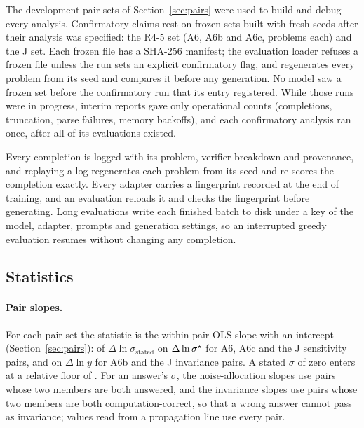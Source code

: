 The development pair sets of Section~\ref{sec:pairs} were used to build and debug every analysis.
Confirmatory claims rest on frozen sets built with fresh seeds after their analysis was specified: the R4-5 set
(A6, A6b and A6c,  problems each) and the J set.
Each frozen file has a SHA-256 manifest; the evaluation loader refuses a frozen file unless the run sets an explicit
confirmatory flag, and regenerates every problem from its seed and compares it before any generation.
No model saw a frozen set before the confirmatory run that its entry registered.
While those runs were in progress, interim reports gave only operational counts (completions, truncation, parse
failures, memory backoffs), and each confirmatory analysis ran once, after all of its evaluations existed.

Every completion is logged with its problem, verifier breakdown and provenance, and replaying a log regenerates each
problem from its seed and re-scores the completion exactly.
Every adapter carries a fingerprint recorded at the end of training, and an evaluation reloads it and checks the
fingerprint before generating.
Long evaluations write each finished batch to disk under a key of the model, adapter, prompts and generation settings,
so an interrupted greedy evaluation resumes without changing any completion.

\subsection{Statistics}
\label{sec:stats}

\paragraph{Pair slopes.}
For each pair set the statistic is the within-pair OLS slope with an intercept (Section~\ref{sec:pairs}): of
$\Delta\ln\sigma_{\text{stated}}$ on $\Delta\ln\sigma^{\star}$ for A6, A6c and the J sensitivity pairs, and on
$\Delta\ln y$ for A6b and the J invariance pairs.
A stated $\sigma$ of zero enters at a relative floor of .
For an answer's $\sigma$, the noise-allocation slopes use pairs whose two members are both answered, and the
invariance slopes use pairs whose two members are both computation-correct, so that a wrong answer cannot pass as
invariance; values read from a propagation line use every pair.

